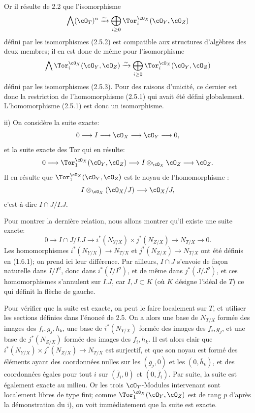 Or il
résulte de 2.2 que l'isomorphisme
\[
\bigwedge(\cO_T)^n\xrightarrow{\sim}
\bigoplus_{i\ge0}\Tor_i^{\cO_X}(\cO_Y,\cO_Z)
\]
défini par les isomorphismes (2.5.2) est compatible aux structures d'algèbres des deux membres; il en est donc de même pour l'isomorphisme
\[
\bigwedge\Tor_i^{\cO_X}(\cO_Y,\cO_Z)\xrightarrow{\sim}
\bigoplus_{i\ge0}\Tor_i^{\cO_X}(\cO_Y,\cO_Z)
\]
défini par les isomorphismes (2.5.3). Pour des raisons d'unicité, ce dernier est donc la restriction de l'homomorphisme (2.5.1) qui avait été défini globalement. L'homomorphisme (2.5.1) est donc un isomorphisme.

ii) On considère la suite exacte:
\[
0\longrightarrow I\longrightarrow \cO_X\longrightarrow \cO_Y\longrightarrow0,
\]
et la suite exacte des Tor qui en résulte:
\[
0\longrightarrow\Tor_1^{\cO_X}(\cO_Y,\cO_Z)
\longrightarrow I\otimes_{\cO_X}\cO_Z
\longrightarrow \cO_Z.
\]
Il en résulte que \(\Tor_1^{\cO_X}(\cO_Y,\cO_Z)\) est le noyau de l'homomorphisme :
\[
I\otimes_{\cO_X}(\cO_X/J)\longrightarrow \cO_X/J,
\]
c'est-à-dire \(I\cap J/I.J\).

Pour montrer la dernière relation, nous allons montrer qu'il existe une suite exacte:
\[
0\longrightarrow I\cap J/I.J
\longrightarrow i^*(N_{Y/X})\times j^*(N_{Z/X})
\longrightarrow N_{T/X}\longrightarrow0.
\]
Les homomorphismes \(i^*(N_{Y/X})\to N_{T/X}\) et \(j^*(N_{Z/X})\to N_{T/X}\) ont été définis en (1.6.1); on prend ici leur différence. Par ailleurs, \(I\cap J\) s'envoie de façon naturelle dans \(I/I^2\), donc dans \(i^*(I/I^2)\), et de même dans \(j^*(J/J^2)\), et ces homomorphismes s'annulent sur \(I.J\), car \(I,J\subset K\) (où \(K\) désigne l'idéal de \(T\)) ce qui définit la flèche de gauche.

Pour vérifier que la suite est exacte, on peut le faire localement sur \(T\), et utiliser les sections définies dans l'énoncé de 2.5. On a alors une base de \(N_{T/X}\) formée des images des \(f_i,g_j,h_k\), une base de \(i^*(N_{Y/X})\) formée des images des \(f_i,g_j\), et une base de \(j^*(N_{Z/X})\) formée des images des \(f_i,h_k\). Il est alors clair que \(i^*(N_{Y/X})\times j^*(N_{Z/X})\to N_{T/X}\) est surjectif, et que son noyau est formé des éléments ayant des coordonnées nulles sur les \((\overline g_j,0)\) et les \((0,\overline h_k)\), et des coordonnées égales pour tout \(i\) sur \((\overline f_i,0)\) et \((0,\overline f_i)\). Par suite, la suite est également exacte au milieu. Or les trois \(\cO_T\)-Modules intervenant sont localement libres de type fini; comme \(\Tor_1^{\cO_X}(\cO_Y,\cO_Z)\) est de rang \(p\) d'après la démonstration du i), on voit immédiatement que la suite est exacte.

